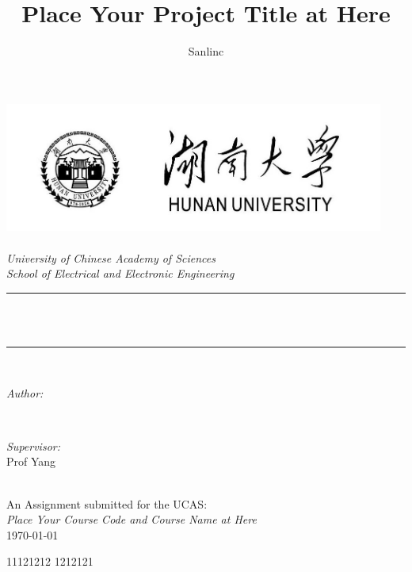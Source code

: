 \documentclass[12pt]{article}
\title{Place Your Project Title at Here}
\author{\textup{Sanlinc}}
\begin{document}
    \renewcommand\theequation{\thesubsection.\arabic{equation}}
    \newtheorem{mythm}{定理}[section]  %

\begin{titlepage}
	\newcommand{\HRule}{\rule{\linewidth}{0.5mm}}
	\includegraphics[width=12.5cm]{sc_logo.jpg}\\[1cm] 
	\center 
	\quad\\[1.5cm]
	\textsl{\Large University of Chinese Academy of Sciences }\\[0.5cm] 
	\textsl{\large School of Electrical and Electronic Engineering}\\[0.5cm] 
	\makeatletter
	\HRule \\[0.4cm]
	{ \huge \bfseries \@title}\\[0.4cm] 
	\HRule \\[1.5cm]
	\begin{minipage}{0.4\textwidth}
		\begin{flushleft} \large
			\emph{Author:}\\
			\@author 
		\end{flushleft}
	\end{minipage}
	~
	\begin{minipage}{0.4\textwidth}
		\begin{flushright} \large
			\emph{Supervisor:} \\
			\textup{Prof Yang}
		\end{flushright}
	\end{minipage}\\[3cm]
	\makeatother
	{\large An Assignment submitted for the UCAS:}\\[0.5cm]
	{\large \emph{Place Your Course Code and Course Name at Here}}\\[0.5cm]
	{\large \today}\\[2cm] 
	\vfill 
\end{titlepage}

\thispagestyle{empty}
\clearpage     %
\tableofcontents        %
11121212
1212121
\pagestyle{headings}
\end{document}
